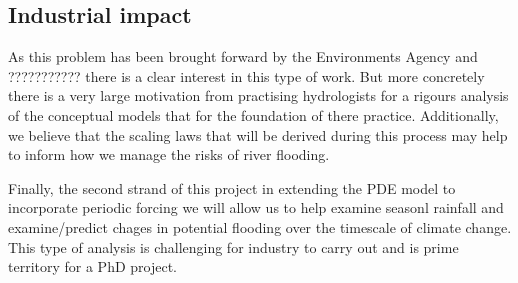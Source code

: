 \documentclass[11pt]{article}
\begin{document}
\subsection{Industrial impact}
As this problem has been brought forward by the Environments Agency and ??????????? there is a clear interest in this type of work. But more concretely there is a very large motivation from practising hydrologists for a rigours analysis of the conceptual models that for the foundation of there practice. Additionally, we believe that the scaling laws that will be derived during this process may help to inform how we manage the risks of river flooding.

Finally, the second strand of this project in extending the PDE model to incorporate periodic forcing we will allow us to help examine seasonl rainfall and examine/predict chages in potential flooding over the timescale of climate change. This type of analysis is challenging for industry to carry out and is prime territory for a PhD project.






\cite{pp1}

\cite{pp2}

\cite{pp3}

\cite{BELL201289}

\printbibliography
\end{document}
